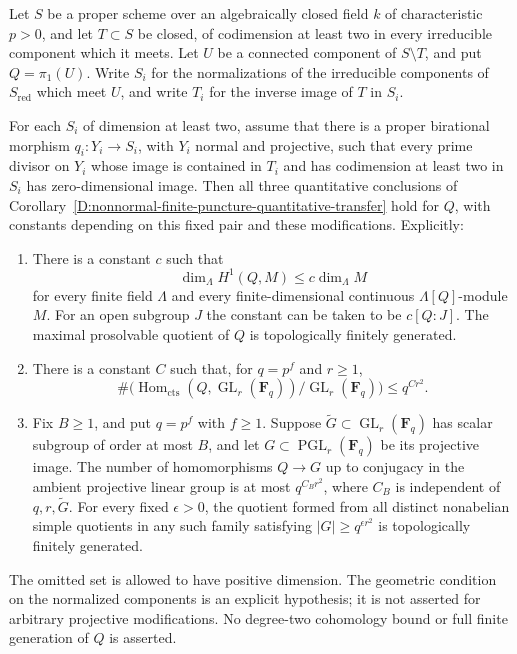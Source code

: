 \begin{corollary}
\label{D:nonnormal-controlled-boundary-quantitative-transfer}
Let $S$ be a proper scheme over an algebraically closed field $k$
of characteristic $p>0$, and let $T\subset S$ be closed, of
codimension at least two in every irreducible component which it
meets.  Let $U$ be a connected component of $S\setminus T$, and put
$Q=\pi_1(U)$.  Write $S_i$ for the normalizations of the irreducible
components of $S_{\mathrm{red}}$ which meet $U$, and write $T_i$
for the inverse image of $T$ in $S_i$.

For each $S_i$ of dimension at least two, assume that there is a
proper birational morphism $q_i:Y_i\to S_i$, with $Y_i$ normal and
projective, such that every prime divisor on $Y_i$ whose image is
contained in $T_i$ and has codimension at least two in $S_i$ has
zero-dimensional image.  Then all three quantitative conclusions
of Corollary~\ref{D:nonnormal-finite-puncture-quantitative-transfer}
hold for $Q$, with constants depending on this fixed pair and these
modifications.  Explicitly:
\begin{enumerate}
\item There is a constant $c$ such that
\[
             \dim_\Lambda H^1(Q,M)\le c\dim_\Lambda M
\]
for every finite field $\Lambda$ and every finite-dimensional
continuous $\Lambda[Q]$-module $M$.  For an open subgroup $J$ the
constant can be taken to be $c[Q:J]$.  The maximal prosolvable
quotient of $Q$ is topologically finitely generated.
\item There is a constant $C$ such that, for $q=p^f$ and $r\ge1$,
\[
 \#\bigl(\operatorname{Hom}_{\mathrm{cts}}
       (Q,\operatorname{GL}_r(\mathbf F_q))
       /\operatorname{GL}_r(\mathbf F_q)\bigr)
                 \le q^{Cr^2}.
\]
\item Fix $B\ge1$, and put $q=p^f$ with $f\ge1$.  Suppose
$\widetilde G\subset\operatorname{GL}_r(\mathbf F_q)$ has scalar
subgroup of order at most $B$, and let
$G\subset\operatorname{PGL}_r(\mathbf F_q)$ be its projective
image.  The number of homomorphisms $Q\to G$ up to conjugacy in
the ambient projective linear group is at most $q^{C_Br^2}$,
where $C_B$ is independent of $q,r,\widetilde G$.
For every fixed $\epsilon>0$, the quotient formed from all distinct
nonabelian simple quotients in any such family satisfying
$|G|\ge q^{\epsilon r^2}$ is topologically finitely generated.
\end{enumerate}
The omitted set is allowed to have positive dimension.  The
geometric condition on the normalized components is an explicit
hypothesis; it is not asserted for arbitrary projective
modifications.  No degree-two cohomology bound or full finite
generation of $Q$ is asserted.
\end{corollary}

